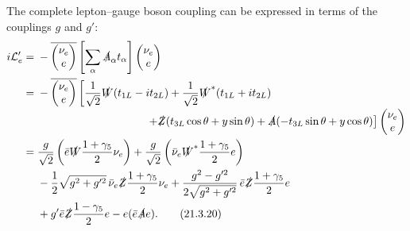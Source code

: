 The complete lepton--gauge boson coupling can be expressed in terms of the couplings $g$ and $g'$:
\begin{align}
i\mathcal{L}'_e
={}&-\overline{\begin{pmatrix}\nu_e\\e\end{pmatrix}}
\left[\sum_\alpha\sl A_\alpha t_\alpha\right]
\begin{pmatrix}\nu_e\\e\end{pmatrix}
\notag\\
={}&-\overline{\begin{pmatrix}\nu_e\\e\end{pmatrix}}
\left[
\frac{1}{\sqrt{2}}\sl W(t_{1L}-it_{2L})
+\frac{1}{\sqrt{2}}\sl W^*(t_{1L}+it_{2L})
\right.
\notag\\[-2pt]
&\left.\hspace{35mm}
+\sl Z(t_{3L}\cos\theta+y\sin\theta)
+\sl A(-t_{3L}\sin\theta+y\cos\theta)
\right]
\begin{pmatrix}\nu_e\\e\end{pmatrix}
\notag\\
={}&\frac{g}{\sqrt{2}}
\left(\bar e\sl W\frac{1+\gamma_5}{2}\nu_e\right)
+\frac{g}{\sqrt{2}}
\left(\bar\nu_e\sl W^*\frac{1+\gamma_5}{2}e\right)
\notag\\
&-\frac{1}{2}\sqrt{g^2+g'^2}\,
\bar\nu_e\sl Z\frac{1+\gamma_5}{2}\nu_e
+\frac{g^2-g'^2}{2\sqrt{g^2+g'^2}}\,
\bar e\sl Z\frac{1+\gamma_5}{2}e
\notag\\
&+g'\bar e\sl Z\frac{1-\gamma_5}{2}e
-e(\bar e\sl A e).
\tag{21.3.20}\label{eq:21.3.20}
\end{align}

